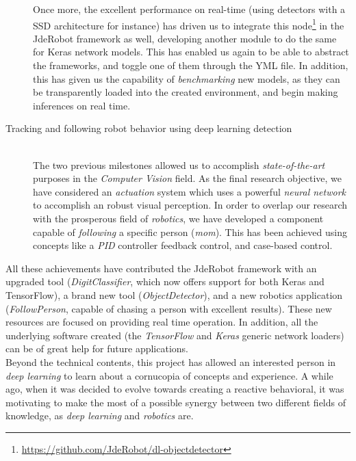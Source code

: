 \begin{description}
			Once more, the excellent performance on real-time (using detectors with a SSD architecture for instance) has driven us to integrate this node\footnote{\url{https://github.com/JdeRobot/dl-objectdetector}} in the JdeRobot framework as well, developing another module to do the same for Keras network models. This has enabled us again to be able to abstract the frameworks, and toggle one of them through the YML file. In addition, this has given us the capability of \emph{benchmarking} new models, as they can be transparently loaded into the created environment, and begin making inferences on real time.
		
		\item[Tracking and following robot behavior using deep learning detection] \hfill
			\vspace{0.2in} \\
			The two previous milestones allowed us to accomplish \emph{state-of-the-art} purposes in the \emph{Computer Vision} field. As the final research objective, we have considered an \emph{actuation} system which uses a powerful \emph{neural network} to accomplish an robust visual perception. In order to overlap our research with the prosperous field of \emph{robotics}, we have developed a component capable of \emph{following} a specific person (\emph{mom}). This has been achieved using concepts like a \emph{PID} controller feedback control, and case-based control.\\
			
	\end{description}
	
	All these achievements have contributed the JdeRobot framework with an upgraded tool (\emph{DigitClassifier}, which now offers support for both Keras and TensorFlow), a brand new tool (\emph{ObjectDetector}), and a new robotics application (\emph{FollowPerson}, capable of chasing a person with excellent results). These new resources are focused on providing real time operation. In addition, all the underlying software created (the \emph{TensorFlow} and \emph{Keras} generic network loaders) can be of great help for future applications.\\
	
	Beyond the technical contents, this project has allowed an interested person in \emph{deep learning} to learn about a cornucopia of concepts and experience. A while ago, when it was decided to evolve towards creating a reactive behavioral, it was motivating to make the most of a possible synergy between two different fields of knowledge, as \emph{deep learning} and \emph{robotics} are.\\
	

